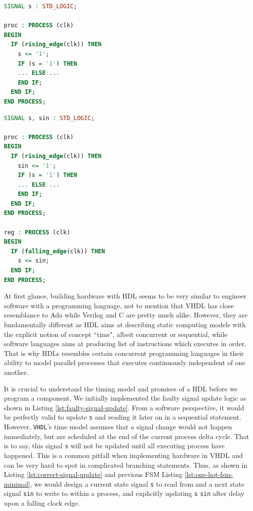 \documentclass[a4paper]{report}
\newcommand{\proglang}{\textsf}
\newcommand{\code}{\texttt}
\begin{document}
\begin{minipage}{.45\textwidth}
\begin{lstlisting}[language=VHDL, caption=Faulty Signal Update in \proglang{VHDL}, label={lst:faulty-signal-update}]
SIGNAL s : STD_LOGIC;

proc : PROCESS (clk)
BEGIN
  IF (rising_edge(clk)) THEN
    s <= '1';
    IF (s = '1') THEN
    ... ELSE ...
    END IF;
  END IF;
END PROCESS;
\end{lstlisting}
\end{minipage}\hfill
\begin{minipage}{.45\textwidth}
\begin{lstlisting}[language=VHDL, caption=Correct Signal Update in \proglang{VHDL}, label={lst:correct-signal-update}]
SIGNAL s, sin : STD_LOGIC;

proc : PROCESS (clk)
BEGIN
  IF (rising_edge(clk)) THEN
    sin <= '1';
    IF (s = '1') THEN
    ... ELSE ...
    END IF;
  END IF;
END PROCESS;

reg : PROCESS (clk)
BEGIN
  IF (falling_edge(clk)) THEN
    s <= sin;
  END IF;
END PROCESS;
\end{lstlisting}
\end{minipage}

At first glance, building hardware with HDL seems to be very similar to engineer software with a programming language, not to mention that \proglang{VHDL} has close resemblance to \proglang{Ada} while \proglang{Verilog} and \proglang{C} are pretty much alike. However, they are fundamentally different as HDL aims at describing static computing models with the explicit notion of concept ``time", albeit concurrent or sequential, while software languages aims at producing list of instructions which executes in order. That is why HDLs resembles certain concurrent programming languages in their ability to model parallel processes that executes continuously independent of one another.

It is crucial to understand the timing model and promises of a HDL before we program a component. We initially implemented the faulty signal update logic as shown in Listing \ref{lst:faulty-signal-update}. From a software perspective, it would be perfectly valid to update \code{s} and reading it later on in a sequential statement. However, \code{VHDL}'s time model assumes that a signal change would not happen immediately, but are scheduled at the end of the current process delta cycle. That is to say, this signal \code{s} will not be updated until all executing process have happened. This is a common pitfall when implementing hardware in \proglang{VHDL} and can be very hard to spot in complicated branching statements. Thus, as shown in Listing \ref{lst:correct-signal-update} and previous FSM Listing \ref{lst:one-hot-fsm-minimal}, we would design a current state signal \code{s} to read from and a next state signal \code{sin} to write to within a process, and explicitly updating \code{s} \textleftarrow \code{sin} after delay upon a falling clock edge. 
\end{document}
